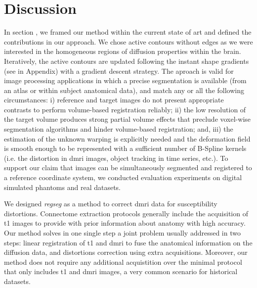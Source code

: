 \section*{Discussion}
\label{sec:discussion}
In section , we framed our method within the current
  state of art and defined the contributions in our approach.
We chose active contours without edges as we were interested in the homogeneous
  regions of diffusion properties within the brain.
Iteratively, the active contours are updated following the instant shape gradients
  (see  in Appendix) with a gradient descent strategy.
The aproach is valid for image processing applications in which a precise segmentation is
  available (from an atlas or within subject anatomical data), and match any or all
  the following circumstances:
  i) reference and target images do not present appropriate contrasts to
  	perform volume-based registration reliably;
  ii) the low resolution of the target volume produces strong partial volume effects
  	that preclude voxel-wise segmentation algorithms and hinder volume-based
  	registration; and,
  iii) the estimation of the unknown warping is explicitly needed and the
    deformation field is smooth enough to be represented with a sufficient number
  	of B-Spline kernels (i.e. the distortion in \gls*{dmri} images,
  	object tracking in time series, etc.).
To support our claim that images can be simultaneously segmented and registered to a
  reference coordinate system, we conducted evaluation experiments on digital
  simulated phantoms and real datasets.

We designed \emph{regseg} as a method to correct \gls*{dmri} data for susceptibility
  distortions.
Connectome extraction protocols generally include the acquisition of \gls*{t1} images
  to provide with prior information about anatomy with high accuracy.
Our method solves in one single step a joint problem usually addressed in two steps:
  linear registration of \gls*{t1} and \gls*{dmri} to fuse the anatomical information on
  the diffusion data, and distortions correction using extra acquisitions.
Moreover, our method does not require any additional acquistition over the minimal protocol
  that only includes \gls*{t1} and \gls*{dmri} images, a very common scenario for
  historical datasets.


